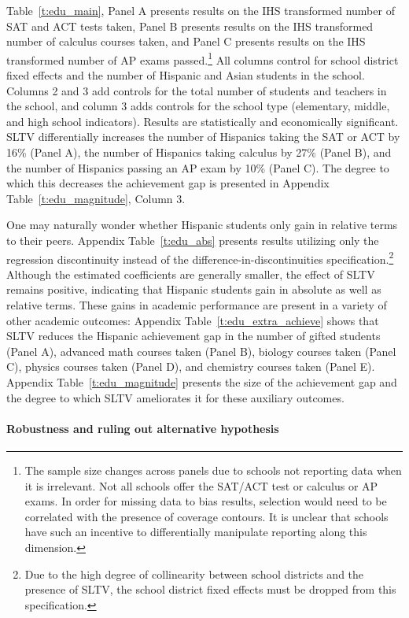 \documentclass[11pt]{article}
\begin{document}
Table~\ref{t:edu_main}, Panel A presents results on the IHS transformed number of SAT and ACT tests taken, Panel B presents results on the IHS transformed number of calculus courses taken, and Panel C presents results on the IHS transformed number of AP exams passed.\footnote{ The sample size changes across panels due to schools not reporting data when it is irrelevant. Not all schools offer the SAT/ACT test or calculus or AP exams. In order for missing data to bias results, selection would need to be correlated with the presence of coverage contours. It is unclear that schools have such an incentive to differentially manipulate reporting along this dimension.} All columns control for school district fixed effects and the number of Hispanic and Asian students in the school. Columns 2 and 3 add controls for the total number of students and teachers in the school, and column 3 adds controls for the school type (elementary, middle, and high school indicators). Results are statistically and economically significant. SLTV differentially increases the number of Hispanics taking the SAT or ACT by 16\% (Panel A), the number of Hispanics taking calculus by 27\% (Panel B), and the number of Hispanics passing an AP exam by 10\% (Panel C). The degree to which this decreases the achievement gap is presented in Appendix Table~\ref{t:edu_magnitude}, Column 3. 

One may naturally wonder whether Hispanic students only gain in relative terms to their peers. Appendix Table~\ref{t:edu_abs} presents results utilizing only the regression discontinuity instead of the difference-in-discontinuities specification.\footnote{ Due to the high degree of collinearity between school districts and the presence of SLTV, the school district fixed effects must be dropped from this specification.}  Although the estimated coefficients are generally smaller, the effect of SLTV remains positive, indicating that Hispanic students gain in absolute as well as relative terms. These gains in academic performance are present in a variety of other academic outcomes: Appendix Table~\ref{t:edu_extra_achieve} shows that SLTV reduces the Hispanic achievement gap in the number of gifted students (Panel A), advanced math courses taken (Panel B), biology courses taken (Panel C), physics courses taken (Panel D), and chemistry courses taken (Panel E). Appendix Table~\ref{t:edu_magnitude} presents the size of the achievement gap and the degree to which SLTV ameliorates it for these auxiliary outcomes.


\paragraph{Robustness and ruling out alternative hypothesis}
\end{document}
